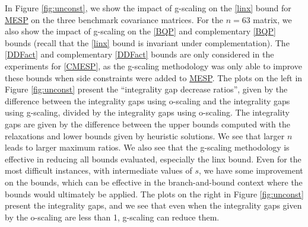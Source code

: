 \documentclass[smallextended]{svjour3hack}       %
\begin{document}
{%

In Figure \ref{fig:unconst}, we show the impact of  g-scaling on the  \ref{linx} bound for \hyperlink{MESP}{MESP} on the three benchmark covariance matrices. For  the $n=63$ matrix, we also show the impact of  g-scaling on the \ref{BQP} and complementary \ref{BQP} bounds (recall that the \ref{linx} bound is invariant under complementation). The \ref{DDFact} and complementary \ref{DDFact} bounds are only considered in the experiments for \ref{CMESP}, as the g-scaling methodology was only able to improve these bounds when side constraints were added to \hyperlink{MESP}{MESP}.
The plots on the left in Figure \ref{fig:unconst} present the ``integrality gap decrease ratios'', given by the difference between the integrality gaps using o-scaling and the integrality gaps using g-scaling, divided by the  integrality gaps using o-scaling.
The integrality gaps are given by the difference between the upper bounds computed with the relaxations and
     lower bounds given by heuristic solutions. We see that larger  $n$ leads to larger  maximum ratios. We also see that the g-scaling methodology is effective in reducing all bounds evaluated, especially the linx bound. Even for the most difficult instances, with intermediate values of $s$, we have some improvement on the bounds, which can be  effective in the branch-and-bound context where the bounds would ultimately be applied. The plots on the right in Figure \ref{fig:unconst} present the integrality gaps, and we see that even when the integrality gaps given by the o-scaling are less than 1,  g-scaling can reduce them.





}
\end{document}

